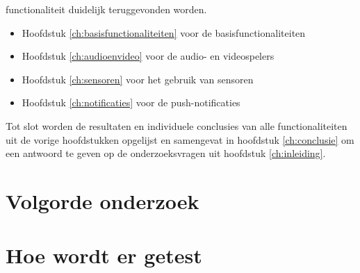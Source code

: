 functionaliteit duidelijk teruggevonden worden.
\begin{itemize}
    \item Hoofdstuk \ref{ch:basisfunctionaliteiten} voor de basisfunctionaliteiten
    \item Hoofdstuk \ref{ch:audioenvideo} voor de audio- en videospelers
    \item Hoofdstuk \ref{ch:sensoren} voor het gebruik van sensoren
    \item Hoofdstuk \ref{ch:notificaties} voor de push-notificaties
\end{itemize}
Tot slot worden de resultaten en individuele conclusies van alle 
functionaliteiten uit de vorige hoofdstukken opgelijst en samengevat in hoofdstuk 
\ref{ch:conclusie} om een antwoord te geven op de onderzoeksvragen uit 
hoofdstuk \ref{ch:inleiding}.

\section{Volgorde onderzoek}



\section{Hoe wordt er getest}





